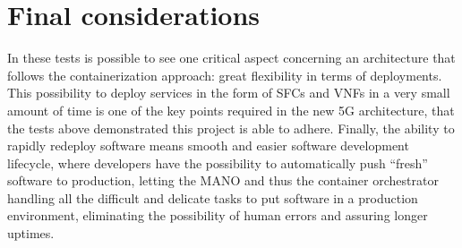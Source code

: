\section{Final considerations}

In these tests is possible to see one critical aspect concerning an architecture
that follows the containerization approach: great flexibility in terms of
deployments. This possibility to deploy services in the form of SFCs and VNFs in
a very small amount of time is one of the key points required in the new 5G
architecture, that the tests above demonstrated this project is able to adhere.
Finally, the ability to rapidly redeploy software means smooth and easier
software development lifecycle, where developers have the possibility to
automatically push ``fresh'' software to production, letting the MANO and thus
the container orchestrator handling all the difficult and delicate tasks to put
software in a production environment, eliminating the possibility of human
errors and assuring longer uptimes.